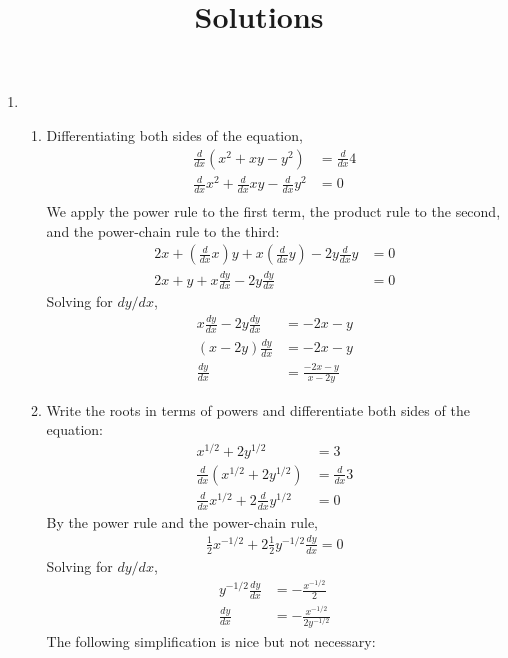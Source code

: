 \documentclass{article}
\title{\commonPSTitleZeroTwoSix\ Solutions}
\author{\commonAuthor}
\date{\commonDateZeroTwoSix}
\begin{document}
\maketitle
\begin{enumerate}
\item %
  \begin{enumerate}
  \item Differentiating both sides of the equation,
    \begin{align*}
      \frac{d}{dx} (x^2+xy-y^2) &= \frac{d}{dx} 4 \\
      \frac{d}{dx} x^2 + \frac{d}{dx} xy - \frac{d}{dx} y^2 &= 0 \\
    \end{align*}
    We apply the power rule to the first term, the product rule to the
    second, and the power-chain rule to the third:
    \begin{align*}
      2x + \left( \frac{d}{dx} x\right) y + x \left(\frac{d}{dx}
      y\right) - 2y \frac{d}{dx} y &= 0 \\
      2x + y + x \frac{dy}{dx} - 2y \frac{dy}{dx} &= 0
    \end{align*}
    Solving for $dy/dx$,
    \begin{align*}
      x \frac{dy}{dx} - 2y \frac{dy}{dx} &= -2x - y \\
      (x-2y) \frac{dy}{dx} &= -2x-y \\
      \frac{dy}{dx} &= \frac{-2x-y}{x-2y}
    \end{align*}
  \item Write the roots in terms of powers and differentiate both
    sides of the equation:
    \begin{align*}
      x^{1/2} + 2y^{1/2} &= 3 \\
      \frac{d}{dx} (x^{1/2} + 2y^{1/2}) &= \frac{d}{dx} 3 \\
      \frac{d}{dx} x^{1/2} + 2\frac{d}{dx} y^{1/2} &= 0
    \end{align*}
    By the power rule and the power-chain rule,
    \begin{align*}
      \frac{1}{2} x^{-1/2} + 2 \frac{1}{2} y^{-1/2} \frac{dy}{dx} =0
    \end{align*}
    Solving for $dy/dx$,
    \begin{align*}
      y^{-1/2} \frac{dy}{dx} &= -\frac{x^{-1/2}}{2} \\
      \frac{dy}{dx} &= -\frac{x^{-1/2}}{2y^{-1/2}}
    \end{align*}
    The following simplification is nice but not necessary:

\end{enumerate}
\end{enumerate}
\end{document}
